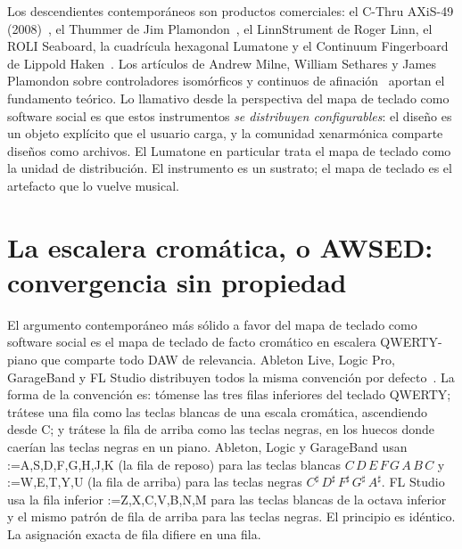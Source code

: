 \documentclass[10pt,letterpaper,twocolumn]{article}
\makeatletter
\DeclareRobustCommand{\key}[1]{\tikz[baseline=(k.base)]{%
 \node[fill=keystroke, rounded corners=1.3pt, inner xsep=2.4pt,
    inner ysep=1.9pt, anchor=base, yshift=-1.2pt] at (0,0)
  {\footnotesize\ttfamily\bfseries\vphantom{A}\phantom{#1}};
 \node[draw=keystroke, line width=0.4pt, fill=keyfill,
    rounded corners=1.3pt, inner xsep=2.4pt, inner ysep=1.9pt,
    anchor=base] (k) at (0,0)
  {\footnotesize\ttfamily\bfseries\vphantom{A}#1};}}
\DeclareRobustCommand{\keys}[1]{{\def\sep{}\@for\kk:=#1\do{\sep\key{\kk}\def\sep{\,}}}}
\makeatother
\begin{document}
Los descendientes contemporáneos son productos comerciales: el C-Thru AXiS-49 (2008)~\citep{cthru2008axis49}, el Thummer de Jim Plamondon~\citep{plamondon2003thummer}, el LinnStrument de Roger Linn, el ROLI Seaboard, la cuadrícula hexagonal Lumatone y el Continuum Fingerboard de Lippold Haken~\citep{haken1998indiscrete}. Los artículos de Andrew Milne, William Sethares y James Plamondon sobre controladores isomórficos y continuos de afinación~\citep{milne2007isomorphic,milne2008tuning} aportan el fundamento teórico. Lo llamativo desde la perspectiva del mapa de teclado como software social es que estos instrumentos \emph{se distribuyen configurables}: el diseño es un objeto explícito que el usuario carga, y la comunidad xenarmónica comparte diseños como archivos. El Lumatone en particular trata el mapa de teclado como la unidad de distribución. El instrumento es un sustrato; el mapa de teclado es el artefacto que lo vuelve musical.

\section{La escalera cromática, o AWSED: convergencia sin propiedad}
\label{sec:daw}

El argumento contemporáneo más sólido a favor del mapa de teclado como software social es el mapa de teclado de facto cromático en escalera QWERTY-piano que comparte todo DAW de relevancia. Ableton Live, Logic Pro, GarageBand y FL Studio distribuyen todos la misma convención por defecto~\citep{ableton_musical_typing,apple_logic_musicaltyping,imageline_typing_piano}. La forma de la convención es: tómense las tres filas inferiores del teclado QWERTY; trátese una fila como las teclas blancas de una escala cromática, ascendiendo desde C; y trátese la fila de arriba como las teclas negras, en los huecos donde caerían las teclas negras en un piano. Ableton, Logic y GarageBand usan \keys{A,S,D,F,G,H,J,K} (la fila de reposo) para las teclas blancas $C\,D\,E\,F\,G\,A\,B\,C$ y \keys{W,E,T,Y,U} (la fila de arriba) para las teclas negras $C^\sharp\,D^\sharp\,F^\sharp\,G^\sharp\,A^\sharp$. FL Studio usa la fila inferior \keys{Z,X,C,V,B,N,M} para las teclas blancas de la octava inferior y el mismo patrón de fila de arriba para las teclas negras. El principio es idéntico. La asignación exacta de fila difiere en una fila.
\end{document}
